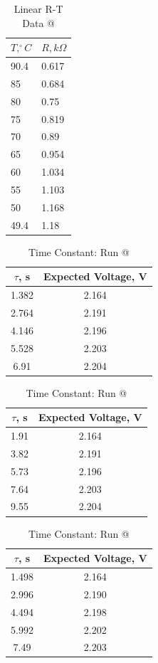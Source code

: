 \documentclass[a4,11pt]{article}
\makeatletter
\newcommand*{\rom}[1]{\expandafter\@slowromancap\romannumeral #1@}
\makeatother
\begin{document}
\begin{table}[H]
	\centering
	\caption{Linear R-T Data \rom{3}}
	\begin{tabular}{l|l}
		\hline
		$T, ^{\circ}C$ & $R, k\Omega$ \\
		\hline
		90.4 & 0.617  \\
		85 & 0.684  \\
		80 & 0.75  \\
		75 & 0.819  \\
		70 & 0.89  \\
		65 & 0.954  \\
		60 & 1.034  \\
		55 & 1.103  \\
		50 & 1.168  \\
		49.4 & 1.18  \\
		\hline
	\end{tabular}
\end{table}
\begin{table}[H]
	\centering
	\caption{Time Constant: Run \rom{1}}
	\label{const1}
	\begin{tabular}{c|c}
		\hline
		$\tau$, s  &  Expected Voltage, V \\
		\hline
		1.382 &  2.164 \\
		2.764 &  2.191 \\
		4.146 & 2.196 \\
		5.528 & 2.203 \\
		6.91 & 2.204 \\
	\end{tabular}
\end{table}
\begin{table}[H]
	\centering
	\caption{Time Constant: Run \rom{2}}
	\label{const2}
	\begin{tabular}{c|c}
		\hline
		$\tau$, s  &  Expected Voltage, V \\
		\hline
		1.91 &  2.164 \\
		3.82 &  2.191 \\
		5.73 & 2.196 \\
		7.64 & 2.203 \\
		9.55 & 2.204 \\
	\end{tabular}
\end{table}
\begin{table}[H]
	\centering
	\caption{Time Constant: Run \rom{3}}
	\label{const3}
	\begin{tabular}{c|c}
		\hline
		$\tau$, s  &  Expected Voltage, V \\
		\hline
		1.498 &  2.164 \\
		2.996 &  2.190 \\
		4.494 & 2.198 \\
		5.992 & 2.202 \\
		7.49 & 2.203 \\
	\end{tabular}
\end{table}
\end{document}
